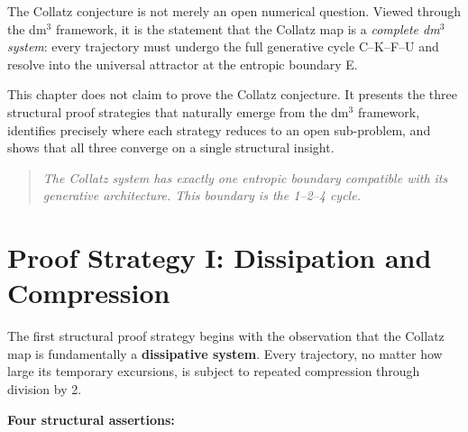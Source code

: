 \documentclass[14pt, twoside, openright]{book}
\theoremstyle{definition}
\theoremstyle{remark}
\newenvironment{structuralclaim}{%
  \begin{quote}\itshape}{\end{quote}}
\begin{document}
The Collatz conjecture is not merely an open numerical question. Viewed through
the dm$^{3}$ framework, it is the statement that the Collatz map is a
\textit{complete dm$^{3}$ system}: every trajectory must undergo the full
generative cycle C--K--F--U and resolve into the universal attractor at the
entropic boundary E.

This chapter does not claim to prove the Collatz conjecture. It presents the
three structural proof strategies that naturally emerge from the dm$^{3}$
framework, identifies precisely where each strategy reduces to an open
sub-problem, and shows that all three converge on a single structural insight.

\begin{structuralclaim}
The Collatz system has exactly one entropic boundary compatible with its
generative architecture. This boundary is the 1--2--4 cycle.
\end{structuralclaim}

\section{Proof Strategy I: Dissipation and Compression}

The first structural proof strategy begins with the observation that the Collatz
map is fundamentally a \textbf{dissipative system}. Every trajectory, no matter
how large its temporary excursions, is subject to repeated compression through
division by 2.

\medskip
\noindent\textbf{Four structural assertions:}
\end{document}
